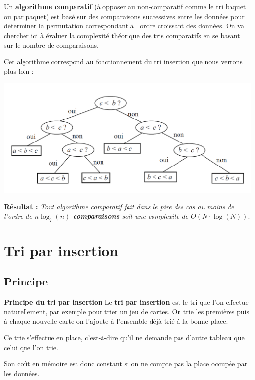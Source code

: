 \begin{exemple2}

Un \textbf{algorithme comparatif} (à opposer au non-comparatif comme le tri baquet ou par paquet) est basé sur des comparaisons successives entre les données pour déterminer la permutation correspondant à l'ordre croissant des données.
On va chercher ici à évaluer la complexité théorique des tris comparatifs en se basant sur le nombre de comparaisons.

Cet algorithme correspond au fonctionnement du tri insertion que nous verrons plus loin :

\begin{center}
\includegraphics[width=.6\textwidth]{images/C2.png}
\end{center}

\textbf{Résultat :}\textit{ Tout algorithme comparatif fait dans le pire des cas au moins de l'ordre de
\textbf{$n \log_2(n)$ comparaisons} soit une complexité de \textbf{$O(N\cdot \log(N))$}}.
\end{exemple2}

\section{Tri par insertion}
\subsection{Principe}

\begin{defi}\small{\textbf{\textsf{Principe du tri par insertion}}}
Le \textbf{tri par insertion} est le tri que l'on effectue naturellement, par exemple pour trier un jeu de cartes. On trie les premières puis à chaque nouvelle carte on l'ajoute à l'ensemble déjà trié à la bonne place. 

Ce trie s'effectue en place, c'est-à-dire qu'il ne demande pas d'autre tableau que celui que l'on trie. 

Son coût en mémoire est donc constant si on ne compte pas la place occupée par les données.
\end{defi}


